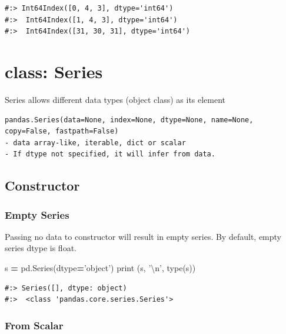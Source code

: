 \documentclass[
]{book}
\newenvironment{Shaded}{\begin{snugshade}}{\end{snugshade}}
\newcommand{\BuiltInTok}[1]{#1}
\newcommand{\CharTok}[1]{\textcolor[rgb]{0.5,0.5,0.5}{#1}}
\newcommand{\NormalTok}[1]{#1}
\newcommand{\OperatorTok}[1]{\textcolor[rgb]{0.43,0.43,0.43}{\textbf{#1}}}
\newcommand{\StringTok}[1]{\textcolor[rgb]{0.5,0.5,0.5}{#1}}
\begin{document}
\begin{verbatim}
#:> Int64Index([0, 4, 3], dtype='int64') 
#:>  Int64Index([1, 4, 3], dtype='int64') 
#:>  Int64Index([31, 30, 31], dtype='int64')
\end{verbatim}

\hypertarget{class-series}{%
\section{class: Series}\label{class-series}}

Series allows different data types (object class) as its element

\begin{verbatim}
pandas.Series(data=None, index=None, dtype=None, name=None, copy=False, fastpath=False)
- data array-like, iterable, dict or scalar
- If dtype not specified, it will infer from data.
\end{verbatim}

\hypertarget{constructor-9}{%
\subsection{Constructor}\label{constructor-9}}

\hypertarget{empty-series}{%
\subsubsection{Empty Series}\label{empty-series}}

Passing no data to constructor will result in empty series. By default, empty series dtype is float.

\begin{Shaded}
\begin{Highlighting}[]
\NormalTok{s }\OperatorTok{=}\NormalTok{ pd.Series(dtype}\OperatorTok{=}\StringTok{'object'}\NormalTok{)}
\BuiltInTok{print}\NormalTok{ (s, }\StringTok{'}\CharTok{\textbackslash{}n}\StringTok{'}\NormalTok{,}
       \BuiltInTok{type}\NormalTok{(s))}
\end{Highlighting}
\end{Shaded}

\begin{verbatim}
#:> Series([], dtype: object) 
#:>  <class 'pandas.core.series.Series'>
\end{verbatim}

\hypertarget{from-scalar}{%
\subsubsection{From Scalar}\label{from-scalar}}
\end{document}
